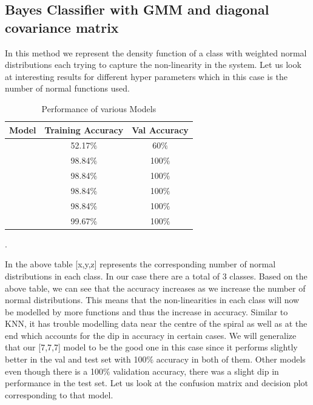 \newpage
\subsection{Bayes Classifier with GMM and diagonal covariance matrix}

In this method we represent the density function of a class with weighted normal distributions each trying to capture the non-linearity in the system. Let us look at interesting results for different hyper parameters which in this case is the number of normal functions used.


{
\begin{table}[!h]
\centering
\begin{tabular}{ |c|c|c| }
\hline
\rowcolor{lightgray} Model & Training Accuracy & Val Accuracy\\
\hline
[1,1,1] & 52.17$\%$  & 60$\%$ \\   
 \hline
[3,3,3] & 98.84$\%$  & 100$\%$ \\ 
\hline
[5,5,5] & 98.84$\%$  & 100$\%$ \\ 
\hline
[7,7,7] & 98.84$\%$  & 100$\%$ \\ 
\hline
[10,10,10] & 98.84$\%$  & 100$\%$\\ 
\hline
[15,15,15] & 99.67$\%$  & 100$\%$ \\ 
\hline
\end{tabular}
\caption{Performance of various Models}.
\label{table:4}
\end{table}
}

In the above table [x,y,z] represents the corresponding number of normal distributions in each class. In our case there are a total of 3 classes. Based on the above table, we can see that the accuracy increases as we increase the number of normal distributions. This means that the non-linearities in each class will now be modelled by more functions and thus the increase in accuracy. Similar to KNN, it has trouble modelling data near the centre of the spiral as well as at the end which accounts for the dip in accuracy in certain cases. We will generalize that our [7,7,7] model to be the good one in this case since it performs slightly better in the val and test set with 100$\%$ accuracy in both of them. Other models even though there is a 100$\%$ validation accuracy, there was a slight dip in performance in the test set. Let us look at the confusion matrix and decision plot corresponding to that model. \\

